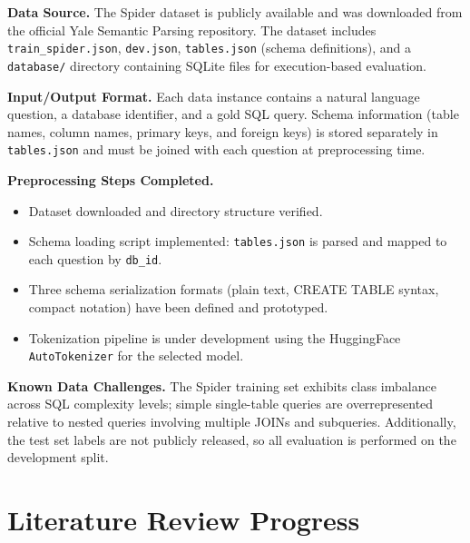 \documentclass[11pt,a4paper]{article}
\begin{document}
\vspace{0.5em}

\noindent\textbf{Data Source.}
The Spider dataset is publicly available and was downloaded from the official
Yale Semantic Parsing repository.
The dataset includes \texttt{train\_spider.json}, \texttt{dev.json},
\texttt{tables.json} (schema definitions), and a \texttt{database/} directory
containing SQLite files for execution-based evaluation.

\noindent\textbf{Input/Output Format.}
Each data instance contains a natural language question, a database identifier,
and a gold SQL query.
Schema information (table names, column names, primary keys, and foreign keys)
is stored separately in \texttt{tables.json} and must be joined with each question
at preprocessing time.

\noindent\textbf{Preprocessing Steps Completed.}
\begin{itemize}[noitemsep]
  \item Dataset downloaded and directory structure verified.
  \item Schema loading script implemented: \texttt{tables.json} is parsed and
        mapped to each question by \texttt{db\_id}.
  \item Three schema serialization formats (plain text, CREATE TABLE syntax,
        compact notation) have been defined and prototyped.
  \item Tokenization pipeline is under development using the HuggingFace
        \texttt{AutoTokenizer} for the selected model.
\end{itemize}

\noindent\textbf{Known Data Challenges.}
The Spider training set exhibits class imbalance across SQL complexity levels;
simple single-table queries are overrepresented relative to nested queries
involving multiple JOINs and subqueries.
Additionally, the test set labels are not publicly released, so all evaluation
is performed on the development split.


\section{Literature Review Progress}
\end{document}
